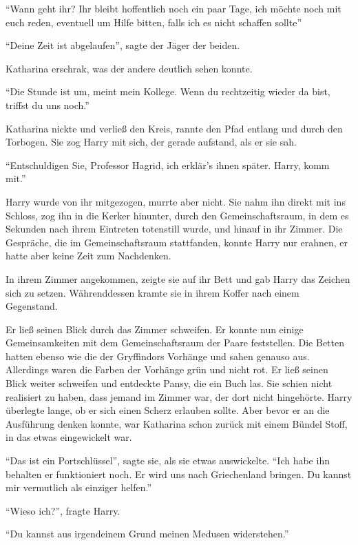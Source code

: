 \enquote{Wann geht ihr? Ihr bleibt hoffentlich noch ein paar Tage, ich möchte noch mit euch reden, eventuell um Hilfe bitten, falls ich es nicht schaffen sollte\abs}

\enquote{Deine Zeit ist abgelaufen}, sagte der Jäger der beiden.

Katharina erschrak, was der andere deutlich sehen konnte.

\enquote{Die Stunde ist um, meint mein Kollege. Wenn du rechtzeitig wieder da bist, triffst du uns noch.}

Katharina nickte und verließ den Kreis, rannte den Pfad entlang und durch den Torbogen. Sie zog Harry mit sich, der gerade aufstand, als er sie sah.

\enquote{Entschuldigen Sie, Professor Hagrid, ich erklär’s ihnen später. Harry, komm mit.}

Harry wurde von ihr mitgezogen, murrte aber nicht. Sie nahm ihn direkt mit ins Schloss, zog ihn in die Kerker hinunter, durch den Gemeinschaftsraum, in dem es Sekunden nach ihrem Eintreten totenstill wurde, und hinauf in ihr Zimmer. Die Gespräche, die im Gemeinschaftsraum stattfanden, konnte Harry nur erahnen, er hatte aber keine Zeit zum Nachdenken.

In ihrem Zimmer angekommen, zeigte sie auf ihr Bett und gab Harry das Zeichen sich zu setzen. Währenddessen kramte sie in ihrem Koffer nach einem Gegenstand.

Er ließ seinen Blick durch das Zimmer schweifen. Er konnte nun einige Gemeinsamkeiten mit dem Gemeinschaftsraum der Paare feststellen. Die Betten hatten ebenso wie die der Gryffindors Vorhänge und sahen genauso aus. Allerdings waren die Farben der Vorhänge grün und nicht rot. Er ließ seinen Blick weiter schweifen und entdeckte Pansy, die ein Buch las. Sie schien nicht realisiert zu haben, dass jemand im Zimmer war, der dort nicht hingehörte. Harry überlegte lange, ob er sich einen Scherz erlauben sollte. Aber bevor er an die Ausführung denken konnte, war Katharina schon zurück mit einem Bündel Stoff, in das etwas eingewickelt war.

\enquote{Das ist ein Portschlüssel}, sagte sie, als sie etwas auswickelte. \enquote{Ich habe ihn behalten \gst er funktioniert noch. Er wird uns nach Griechenland bringen. Du kannst mir vermutlich als einziger helfen.}

\enquote{Wieso ich?}, fragte Harry.

\enquote{Du kannst aus irgendeinem Grund meinen Medusen widerstehen.}

